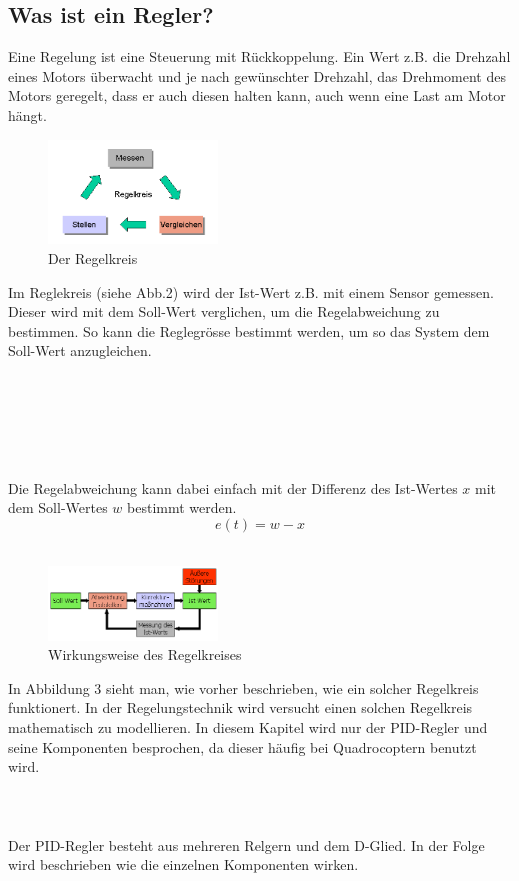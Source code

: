 \documentclass[12pt,a4paper, ngerman]{article}
\begin{document}
\subsection{Was ist ein Regler?}
Eine Regelung ist eine Steuerung mit Rückkoppelung. Ein Wert z.B. die Drehzahl eines Motors überwacht und je nach gewünschter Drehzahl, das Drehmoment des Motors geregelt, dass er auch diesen halten kann, auch wenn eine Last am Motor hängt.\cite{website:rn-wissen_Regelungstechnik}\\
\begin{figure}
\centering
\includegraphics[width=0.4\textwidth]{Regelkreis1.png}
\caption[\url{https://rn-wissen.de/wiki/images/2/25/Regelkreis1.png}]{Der Regelkreis}
\end{figure}
Im Reglekreis (siehe Abb.2) wird der Ist-Wert z.B. mit einem Sensor gemessen. Dieser wird mit dem Soll-Wert verglichen, um die Regelabweichung zu bestimmen. So kann die Reglegrösse bestimmt werden, um so das System dem Soll-Wert anzugleichen.\\ \\ \\ \\ \\ \\ \\
Die Regelabweichung kann dabei einfach mit der Differenz des Ist-Wertes $x$ mit dem Soll-Wertes $w$ bestimmt werden.\cite{website:rn-wissen_Regelungstechnik}
\begin{equation}
e(t)=w-x
\end{equation}\\

\begin{figure}
\centering
\includegraphics[width=0.4\textwidth]{Regelkreis2.png}
\caption[\url{https://rn-wissen.de/wiki/images/5/5d/Regelkreis2.png}]{Wirkungsweise des Regelkreises}
\end{figure}
\noindent
In Abbildung 3 sieht man, wie vorher beschrieben, wie ein solcher Regelkreis funktionert. In der Regelungstechnik wird versucht einen solchen Regelkreis mathematisch zu modellieren. In diesem Kapitel wird nur der PID-Regler und seine Komponenten besprochen, da dieser häufig bei Quadrocoptern benutzt wird.\cite{website:rn-wissen_Regelungstechnik}
\\ \\ \\ \\
Der PID-Regler besteht aus mehreren Relgern und dem D-Glied. In der Folge wird beschrieben wie die einzelnen Komponenten wirken. 
\end{document}
